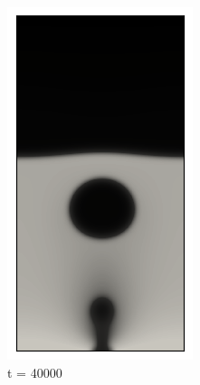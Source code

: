 \begin{figure}[h!]
	\medskip
	\begin{subfigure}{0.25\textwidth}
		\includegraphics[width=\linewidth]{figs/cap4/bubble_40}
		\caption{t = 40000}
		\label{fig:7}
	\end{subfigure}\hfil
	\begin{subfigure}{0.25\textwidth}

\end{subfigure}
\end{figure}

